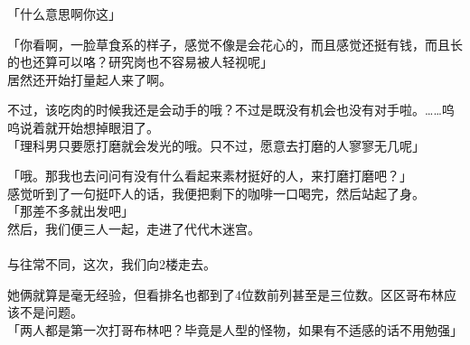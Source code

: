 「什么意思啊你这」

「你看啊，一脸草食系的样子，感觉不像是会花心的，而且感觉还挺有钱，而且长的也还算可以咯？研究岗也不容易被人轻视呢」\\

居然还开始打量起人来了啊。

不过，该吃肉的时候我还是会动手的哦？不过是既没有机会也没有对手啦。……呜呜说着就开始想掉眼泪了。\\

「理科男只要愿打磨就会发光的哦。只不过，愿意去打磨的人寥寥无几呢」

「哦。那我也去问问有没有什么看起来素材挺好的人，来打磨打磨吧？」\\

感觉听到了一句挺吓人的话，我便把剩下的咖啡一口喝完，然后站起了身。\\

「那差不多就出发吧」\\

然后，我们便三人一起，走进了代代木迷宫。\\

\sqsplit\\

与往常不同，这次，我们向2楼走去。

她俩就算是毫无经验，但看排名也都到了4位数前列甚至是三位数。区区哥布林应该不是问题。\\

「两人都是第一次打哥布林吧？毕竟是人型的怪物，如果有不适感的话不用勉强」

